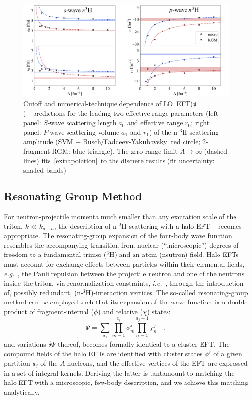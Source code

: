 \documentclass[5p,times]{elsarticle}
\newcommand{\eg}{\textit{e.g.}~}
\newcommand{\ie}{\textit{i.e.}~}
\newcommand{\eftnopi}{\mbox{EFT($\slashed{\pi}$) }}
\begin{document}
\begin{figure}
\centering
  \centering
  \includegraphics[width=\linewidth]{Graphs/ere.pdf}
  \caption{Cutoff and numerical-technique dependence of LO~\eftnopi~predictions
  for the leading two effective-range parameters (left panel: $S$-wave scattering length $a_0$ and effective range $r_0$;
   right panel: $P$-wave scattering volume $a_1$ and $r_1$)
   of the n-$^3$H scattering amplitude
  (SVM + Busch/Faddeev-Yakubovsky: red circle; 2-fragment RGM: blue triangle).
 The zero-range limit $\Lambda \rightarrow \infty$ (dashed lines) fits~\eqref{extrapolation}~to the discrete results
 (fit uncertainty: shaded bands).
 }
  \label{fig:ERE_Parameters}
\end{figure}

\subsection{Resonating Group Method}
For neutron-projectile momenta much smaller than any excitation
scale of the triton, $k\ll k_{d-n}$, the description
of n-$^3$H scattering with a halo EFT~\cite{Hammer:2022lhx}~becomes appropriate. 
The resonating-group expansion
of the four-body wave function
resembles the accompanying transition from nuclear (``microscopic'') 
degrees of freedom to a fundamental trimer ($^3$H) and an atom (neutron)
field. Halo EFTs must account for exchange effects between particles within 
their elemental fields, \eg,
the Pauli repulsion between the projectile neutron and one of the neutrons 
inside the triton, via renormalization constraints, \ie,
through the introduction of, possibly redundant, (n-$^3$H)-interaction vertices.
The so-called resonating-group method can be employed such that its expansion of 
the wave function in a double
product of fragment-internal ($\phi$) and relative ($\chi$) states: 
\begin{equation}
\Psi=\sum_{a_j}\prod_{m=1}^{a_j}\phi^j_m\prod_{n=1}^{a_j-1}\chi^j_n\quad,
\end{equation}
and variations $\delta\Psi$ thereof, becomes formally identical to a cluster EFT. 
The compound fields of the halo EFTs
are identified with cluster states $\phi^j$ of a given partition $a_j$ of the $A$ 
nucleons, and the effective vertices
of the EFT are expressed in a set of integral kernels. Deriving the latter is 
tantamount to matching the halo EFT with
a microscopic, few-body description, and we achieve this matching analytically. 
\end{document}
